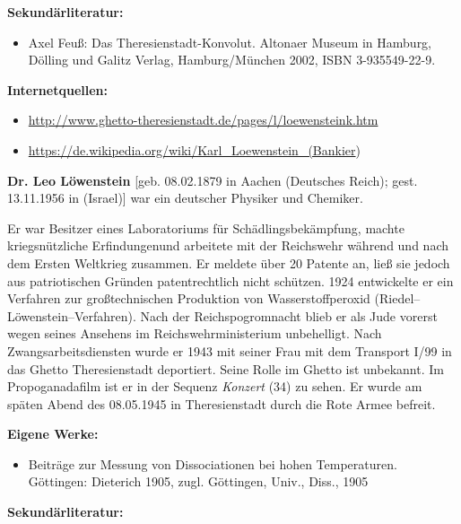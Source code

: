 \documentclass[a4paper]{article}
\begin{document}
\bigskip

\textbf{Sekundärliteratur:}

\begin{itemize}
\item Axel Feuß: Das Theresienstadt-Konvolut. Altonaer Museum in Hamburg, Dölling und Galitz Verlag, Hamburg/München
2002, ISBN 3-935549-22-9.
\end{itemize}

\bigskip


\bigskip

\textbf{Internetquellen:}

\begin{itemize}
\item \url{http://www.ghetto-theresienstadt.de/pages/l/loewensteink.htm} 
\item \url{https://de.wikipedia.org/wiki/Karl_Loewenstein_(Bankier}) 
\end{itemize}

\bigskip

\textbf{Dr. Leo Löwenstein} [geb. 08.02.1879 in Aachen (Deutsches Reich); gest. 13.11.1956 in (Israel)] war ein
deutscher Physiker und Chemiker.

Er war Besitzer eines Laboratoriums für Schädlingsbekämpfung, machte kriegsnützliche Erfindungenund arbeitete mit der
Reichswehr während und nach dem Ersten Weltkrieg zusammen. Er meldete über 20 Patente an, ließ sie jedoch aus
patriotischen Gründen patentrechtlich nicht schützen. 1924 entwickelte er ein Verfahren zur großtechnischen Produktion
von Wasserstoffperoxid (Riedel–Löwenstein–Verfahren). Nach der Reichspogromnacht blieb er als Jude vorerst wegen seines
Ansehens im Reichswehrministerium unbehelligt. Nach Zwangsarbeitsdiensten wurde er 1943 mit seiner Frau mit dem
Transport I/99 in das Ghetto Theresienstadt deportiert. Seine Rolle im Ghetto ist unbekannt. Im Propoganadafilm ist er
in der Sequenz \textit{Konzert} (34) zu sehen. Er wurde am späten Abend des 08.05.1945 in Theresienstadt durch die Rote
Armee befreit. 


\bigskip

\textbf{Eigene Werke:}

\begin{itemize}
\item Beiträge zur Messung von Dissociationen bei hohen Temperaturen. Göttingen: Dieterich 1905, zugl. Göttingen, Univ.,
Diss., 1905
\end{itemize}

\bigskip

\textbf{Sekundärliteratur:}
\end{document}
